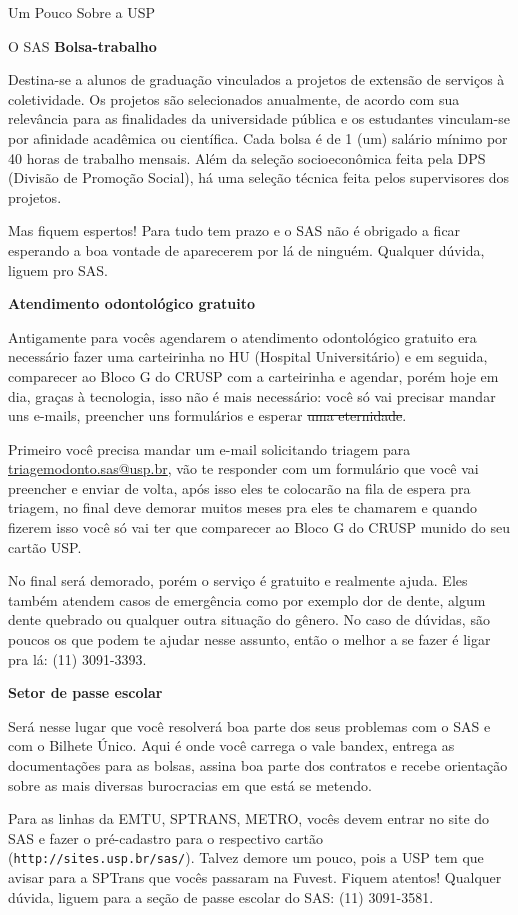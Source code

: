 \begin{secao}{Um Pouco Sobre a USP}
\begin{subsecao}{O SAS}
{\bf Bolsa-trabalho}

Destina-se a alunos de graduação vinculados a projetos de extensão de serviços à
coletividade. Os projetos são selecionados anualmente, de acordo com sua relevância
para as finalidades da universidade pública e os estudantes vinculam-se por
afinidade acadêmica ou científica. Cada bolsa é de 1 (um) salário mínimo por
40 horas de trabalho mensais. Além da seleção socioeconômica feita pela
DPS (Divisão de Promoção Social), há uma seleção técnica feita pelos supervisores
dos projetos.

Mas fiquem espertos! Para tudo tem prazo e o SAS não é obrigado a ficar esperando a
boa vontade de aparecerem por lá de ninguém. Qualquer dúvida, liguem pro SAS.

{\bf Atendimento odontológico gratuito}

Antigamente para vocês agendarem o atendimento odontológico gratuito era necessário fazer uma
carteirinha no HU (Hospital Universitário) e em seguida, comparecer ao Bloco G
do CRUSP com a carteirinha e agendar, porém hoje em dia, graças à tecnologia,
isso não é mais necessário: você só vai precisar mandar uns e-mails, preencher uns
formulários e esperar \sout{uma eternidade}.

Primeiro você precisa mandar um e-mail solicitando triagem para \url{triagemodonto.sas@usp.br},
vão te responder com um formulário que você vai preencher e enviar de volta, após isso eles
te colocarão na fila de espera pra triagem, no final deve demorar muitos meses pra
eles te chamarem e quando fizerem isso você só vai ter que comparecer ao Bloco G do CRUSP
munido do seu cartão USP.

No final será demorado, porém o serviço é gratuito e realmente ajuda. Eles também atendem casos
de emergência como por exemplo dor de dente, algum dente quebrado ou qualquer outra situação
do gênero. No caso de dúvidas, são poucos os que podem te ajudar nesse assunto, então o melhor
a se fazer é ligar pra lá: (11) 3091-3393.

\pagebreak
{\bf Setor de passe escolar}

Será nesse lugar que você resolverá boa parte dos seus problemas com o SAS e com o
Bilhete Único. Aqui é onde você carrega o vale bandex, entrega as documentações para
as bolsas, assina boa parte dos contratos e recebe orientação sobre as mais diversas
burocracias em que está se metendo.

Para as linhas da EMTU, SPTRANS, METRO, vocês devem entrar no site do SAS e fazer
o pré-cadastro para o respectivo cartão ({\tt http://sites.usp.br/sas/}). Talvez demore um pouco, pois a USP tem que
avisar para a SPTrans que vocês passaram na Fuvest. Fiquem atentos! Qualquer dúvida,
liguem para a seção de passe escolar do SAS: (11) 3091-3581.


\end{subsecao}
\end{secao}
